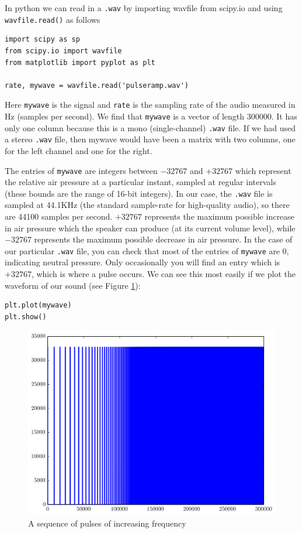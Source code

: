 In python we can read in a \texttt{.wav} by importing wavfile from scipy.io and using \texttt{wavfile.read()} as follows
\begin{lstlisting}
import scipy as sp
from scipy.io import wavfile
from matplotlib import pyplot as plt 

rate, mywave = wavfile.read('pulseramp.wav')
\end{lstlisting}
Here \texttt{mywave} is the signal and \texttt{rate} is the sampling rate of the audio measured in Hz (samples per second). 
% 
We find that \texttt{mywave} is a vector of length $300000$.
It has only one column because this is a mono (single-channel) \texttt{.wav} file. 
If we had used a stereo \texttt{.wav} file, then mywave would have been a matrix with two columns, one for the left channel and one for the right.

The entries of \texttt{mywave} are integers between $-32767$ and $+32767$ which represent the relative air pressure at a particular instant, sampled at regular intervals (these bounds are the range of 16-bit integers).   
In our case, the \texttt{.wav} file is sampled at 44.1KHz (the standard sample-rate for high-quality audio), so there are 44100 samples per second. 
$+32767$ represents the maximum possible increase in air pressure which the speaker can produce (at its current volume level), while $-32767$ represents the maximum possible decrease in air pressure. 
In the case of our particular \texttt{.wav} file, you can check that most of the entries of \texttt{mywave} are $0$, indicating neutral pressure. 
Only occasionally you will find an entry which is $+32767$, which is where a pulse occurs.
We can see this most easily if we plot the waveform of our sound (see Figure \ref{pulseramp}):
\begin{lstlisting}
plt.plot(mywave)
plt.show()
\end{lstlisting}
\begin{figure}[ht]\caption{A sequence of pulses of increasing frequency}\label{pulseramp}\centering\includegraphics[width=\textwidth]{pulseramp}\end{figure}

